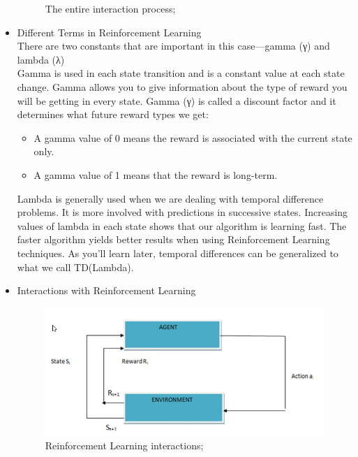 \documentclass[14pt,a4paper]{report}  %
\begin{document}
\begin{itemize}
\begin{figure}[hbt!]
\begin{center}
\caption{The entire interaction process; }%
\end{center}
\end{figure}
\item Different Terms in Reinforcement Learning\\
There are two constants that are important in this case—gamma (γ) and lambda (λ)\\[10pt]
Gamma is used in each state transition and is a constant value at each state change. 
Gamma allows you to give information about the type of reward you will be getting in 
every state. 
Gamma (γ) is called a discount 
factor and it determines what future reward types we get:\\
\begin{itemize}
\item A gamma value of 0 means the reward is associated with the 
current state only.
\end{itemize}

\begin{itemize}
\item A gamma value of 1 means that the reward is long-term.
\end{itemize}
Lambda is generally used when we are dealing with temporal difference problems. It is 
more involved with predictions in successive states.
Increasing values of lambda in each state shows that our algorithm is learning fast. 
The faster algorithm yields better results when using Reinforcement Learning techniques.
As you’ll learn later, temporal differences can be generalized to what we call 
TD(Lambda).\\
\item Interactions with Reinforcement Learning\\
\begin{figure}[hbt!]
\begin{center}
\includegraphics[scale=0.74]{ Reinforcement_Learning_interactions}
\caption{Reinforcement Learning interactions; }%
\end{center}
\end{figure}


\end{itemize}
\end{document}
